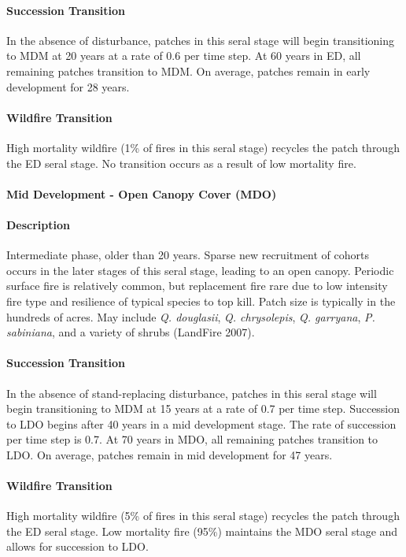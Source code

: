 \paragraph{Succession Transition} In the absence of disturbance, patches in this seral stage will begin transitioning to MDM at 20 years at a rate of 0.6 per time step. At 60 years in ED, all remaining patches transition to MDM. On average, patches remain in early development for 28 years.

\paragraph{Wildfire Transition} High mortality wildfire (1\% of fires in this seral stage) recycles the patch through the ED seral stage. No transition occurs as a result of low mortality fire. 

\noindent\hrulefill


\paragraph{Mid Development - Open Canopy Cover (MDO)}

\paragraph{Description} Intermediate phase, older than 20 years. Sparse new recruitment of cohorts occurs in the later stages of this seral stage, leading to an open canopy. Periodic surface fire is relatively common, but replacement fire rare due to low intensity fire type and resilience of typical species to top kill. Patch size is typically in the hundreds of acres. May include \emph{Q. douglasii}, \emph{Q. chrysolepis}, \emph{Q. garryana}, \emph{P. sabiniana}, and a variety of shrubs (LandFire 2007).

\paragraph{Succession Transition} In the absence of stand-replacing disturbance, patches in this seral stage will begin transitioning to MDM at 15 years at a rate of 0.7 per time step. Succession to LDO begins after 40 years in a mid development stage. The rate of succession per time step is 0.7. At 70 years in MDO, all remaining patches transition to LDO. On average, patches remain in mid development for 47 years.

\paragraph{Wildfire Transition} High mortality wildfire (5\% of fires in this seral stage) recycles the patch through the ED seral stage. Low mortality fire (95\%) maintains the MDO seral stage and allows for succession to LDO.

